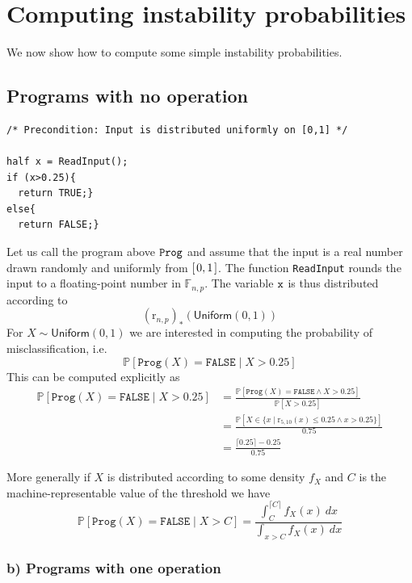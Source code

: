 \documentclass[10pt,a4paper]{article}
\theoremstyle{plain}
\theoremstyle{definition}
\newcommand{\F}[1][n,p]{\mathbb{F}_{#1}}
\newcommand{\R}{\mathbb{R}}
\newcommand{\B}{\mathbb{B}}
\newcommand{\Round}[1][n,p]{\mathrm{r}_{#1}}
\newcommand{\Unif}{\mathsf{Uniform}}
\newcommand{\ceil}[1]{\lceil #1 \rceil}
\newcommand{\intvl}[1]{\mathlarger{\left[\right.}  #1 \mathlarger{\left.\right]}}
\newcommand{\Pro}[1]{\mathbb{P}\left[ #1 \right]}
\begin{document}
\section{Computing instability probabilities}

We now show how to compute some simple instability probabilities.

\subsection{Programs with no operation}


\begin{lstlisting}
/* Precondition: Input is distributed uniformly on [0,1] */

half x = ReadInput();
if (x>0.25){
  return TRUE;}
else{
  return FALSE;} 
\end{lstlisting}

Let us call the program above $\tt Prog$ and assume that the input is a real number drawn randomly and uniformly from $\intvl{0,1}$. The function \texttt{ReadInput} rounds the input to a floating-point number in $\F$. The variable $\tt x$ is thus distributed according to
\[
(\Round)_\ast(\Unif(0,1))
\]
For $X\sim\Unif(0,1)$ we are interested in computing the probability of misclassification, i.e.\@
\[
\Pro{\mathtt{Prog}(X)=\mathtt{FALSE}\mid X> 0.25}
\]
This can be computed explicitly as
\begin{align*}
\Pro{\mathtt{Prog}(X)=\mathtt{FALSE}\mid X> 0.25}&=\frac{\Pro{\mathtt{Prog}(X)=\mathtt{FALSE} \wedge X> 0.25}}{\Pro{X> 0.25}}\\
&=\frac{\Pro{X\in \{x\mid\Round[5,10](x)\leq 0.25\wedge  x>0.25  \}}}{0.75}\\
&=\frac{\ceil{0.25}-0.25}{0.75}
\end{align*}

More generally if $X$ is distributed according to some density $f_X$ and $C$ is the machine-representable value of the threshold we have
\[
\Pro{\mathtt{Prog}(X)=\mathtt{FALSE}\mid X> C}=\frac{\int_C^{\ceil{C}} f_X(x)~dx}{\int_{x>C} f_X(x)~dx}
\]


\subsubsection*{b) Programs with one operation}

\newcommand{\rRound}{\mathrm{Round}}
\end{document}
